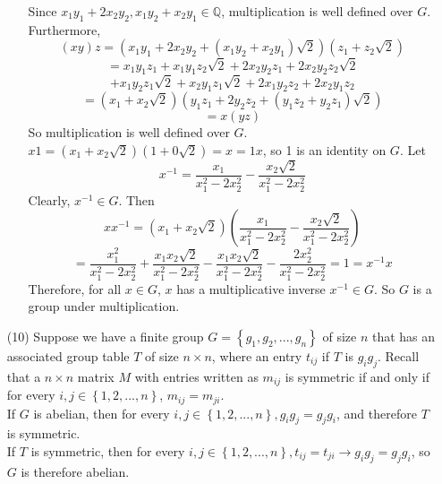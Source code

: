\documentclass[12pt]{article}
\begin{document}
\begin{itemize}
\begin{itemize}
Since $x_1y_1 + 2x_2y_2, x_1y_2 + x_2y_1 \in \mathbb{Q}$, multiplication is well defined over $G$. Furthermore,
$$(xy)z = (x_1y_1 + 2x_2y_2 + (x_1y_2 + x_2y_1)\sqrt{2})(z_1 + z_2\sqrt{2})$$
$$= x_1y_1z_1 + x_1y_1z_2\sqrt{2} + 2x_2y_2z_1 + 2x_2y_2z_2\sqrt{2}$$
$$+ x_1y_2z_1\sqrt{2} + x_2y_1z_1\sqrt{2} + 2x_1y_2z_2 + 2x_2y_1z_2$$
$$= (x_1 + x_2\sqrt{2})(y_1z_1 + 2y_2z_2 + (y_1z_2 + y_2z_1)\sqrt{2})$$
$$= x(yz)$$
So multiplication is well defined over $G$. $x1 = (x_1 + x_2\sqrt{2})(1 + 0\sqrt{2}) = x = 1x$, so 1 is an identity on $G$. Let 
$$x^{-1} = \frac{x_1}{x_1^2 - 2x_2^2} - \frac{x_2\sqrt{2}}{x_1^2 - 2x_2^2}$$
Clearly, $x^{-1} \in G$. Then
$$xx^{-1} = (x_1 + x_2\sqrt{2})\left(\frac{x_1}{x_1^2 - 2x_2^2} - \frac{x_2\sqrt{2}}{x_1^2 - 2x_2^2} \right)$$
$$= \frac{x_1^2}{x_1^2 - 2x_2^2} + \frac{x_1x_2\sqrt{2}}{x_1^2 - 2x_2^2} - \frac{x_1x_2\sqrt{2}}{x_1^2 - 2x_2^2} - \frac{2x_2^2}{x_1^2 - 2x_2^2} = 1 = x^{-1}x$$
Therefore, for all $x \in G$, $x$ has a multiplicative inverse $x^{-1} \in G$. So $G$ is a group under multiplication. 
\end{itemize}
\item[(10)]
Suppose we have a finite group $G = \left\lbrace g_1, g_2, ..., g_n\right\rbrace$ of size $n$ that has an associated group table $T$ of size $n \times n$, where an entry $t_{ij}$ if $T$ is $g_ig_j$. Recall that a $n \times n$ matrix $M$ with entries written as $m_{ij}$ is symmetric if and only if for every $i,j \in \left\lbrace 1, 2, ..., n \right\rbrace$, $m_{ij} = m_{ji}$. \\
If $G$ is abelian, then for every $i, j \in \left\lbrace 1, 2, ..., n \right\rbrace, g_ig_j = g_jg_i$, and therefore $T$ is symmetric. \\
If $T$ is symmetric, then for every $i, j \in \left\lbrace 1, 2, ..., n \right\rbrace, t_{ij} = t_{ji} \rightarrow g_ig_j = g_jg_i$, so $G$ is therefore abelian.
\end{itemize}
\end{document}

